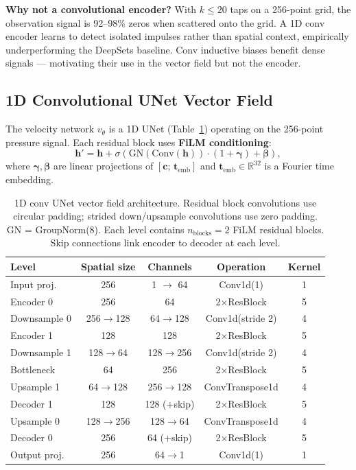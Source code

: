 \documentclass[12pt]{article}
\begin{document}
\textbf{Why not a convolutional encoder?} With $k \leq 20$ taps on a 256-point
grid, the observation signal is 92--98\% zeros when scattered onto the grid.
A 1D conv encoder learns to detect isolated impulses rather than spatial context,
empirically underperforming the DeepSets baseline. Conv inductive biases benefit
dense signals — motivating their use in the vector field but not the encoder.

\subsection{1D Convolutional UNet Vector Field}

The velocity network $v_\theta$ is a 1D UNet (Table~\ref{tab:unet}) operating
on the 256-point pressure signal. Each residual block uses
\textbf{FiLM conditioning}:
\begin{equation}
    \mathbf{h}' = \mathbf{h} + \sigma\!\left(\mathrm{GN}(\mathrm{Conv}(\mathbf{h})) \cdot (1 + \boldsymbol{\gamma}) + \boldsymbol{\beta}\right),
    \label{eq:film}
\end{equation}
where $\boldsymbol{\gamma}, \boldsymbol{\beta}$ are linear projections of
$[\mathbf{c};\,\mathbf{t}_\mathrm{emb}]$ and $\mathbf{t}_\mathrm{emb} \in
\mathbb{R}^{32}$ is a Fourier time embedding.

\begin{table}[ht]
\centering
\caption{1D conv UNet vector field architecture. Residual block convolutions use
circular padding; strided down/upsample convolutions use zero padding. GN =
GroupNorm(8). Each level contains $n_\mathrm{blocks}=2$ FiLM residual blocks.
Skip connections link encoder to decoder at each level.}
\label{tab:unet}
\begin{tabular}{lcccc}
\toprule
Level & Spatial size & Channels & Operation & Kernel \\
\midrule
Input proj.   & 256 & 1 $\to$ 64   & Conv1d(1)    & 1 \\
Encoder 0     & 256 & 64           & 2$\times$ResBlock & 5 \\
Downsample 0  & 256$\to$128 & 64$\to$128  & Conv1d(stride 2) & 4 \\
Encoder 1     & 128 & 128          & 2$\times$ResBlock & 5 \\
Downsample 1  & 128$\to$64  & 128$\to$256 & Conv1d(stride 2) & 4 \\
Bottleneck    & 64  & 256          & 2$\times$ResBlock & 5 \\
Upsample 1    & 64$\to$128  & 256$\to$128 & ConvTranspose1d  & 4 \\
Decoder 1     & 128 & 128 (+skip)  & 2$\times$ResBlock & 5 \\
Upsample 0    & 128$\to$256 & 128$\to$64  & ConvTranspose1d  & 4 \\
Decoder 0     & 256 & 64 (+skip)   & 2$\times$ResBlock & 5 \\
Output proj.  & 256 & 64$\to$1     & Conv1d(1)    & 1 \\
\bottomrule
\end{tabular}
\end{table}
\end{document}
